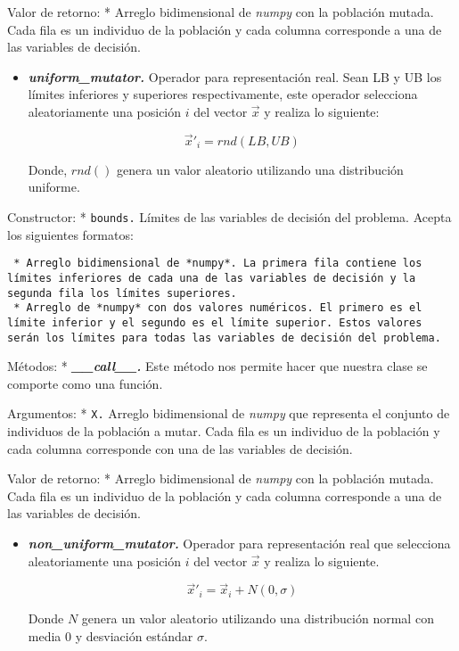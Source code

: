 \documentclass[11pt]{article}
\providecommand{\tightlist}{%
      \setlength{\itemsep}{0pt}\setlength{\parskip}{0pt}}
\begin{document}
Valor de retorno: * Arreglo bidimensional de \emph{numpy} con la
población mutada. Cada fila es un individuo de la población y cada
columna corresponde a una de las variables de decisión.

    \begin{itemize}
\tightlist
\item
  \emph{\textbf{uniform\_mutator.}} Operador para representación real.
  Sean LB y UB los límites inferiores y superiores respectivamente, este
  operador selecciona aleatoriamente una posición \(i\) del vector
  \(\vec{x}\) y realiza lo siguiente:

  \begin{equation}
  \vec{x}'_{i}= rnd(LB,UB)
  \end{equation}

  Donde, \(rnd()\) genera un valor aleatorio utilizando una distribución
  uniforme.
\end{itemize}

Constructor: * \texttt{bounds.} Límites de las variables de decisión del
problema. Acepta los siguientes formatos:

\begin{verbatim}
 * Arreglo bidimensional de *numpy*. La primera fila contiene los límites inferiores de cada una de las variables de decisión y la segunda fila los límites superiores.
 * Arreglo de *numpy* con dos valores numéricos. El primero es el límite inferior y el segundo es el límite superior. Estos valores serán los límites para todas las variables de decisión del problema.
\end{verbatim}

Métodos: * \emph{\textbf{\_\_call\_\_.}} Este método nos permite hacer
que nuestra clase se comporte como una función.

Argumentos: * \texttt{X.} Arreglo bidimensional de \emph{numpy} que
representa el conjunto de individuos de la población a mutar. Cada fila
es un individuo de la población y cada columna corresponde con una de
las variables de decisión.

Valor de retorno: * Arreglo bidimensional de \emph{numpy} con la
población mutada. Cada fila es un individuo de la población y cada
columna corresponde a una de las variables de decisión.

    \begin{itemize}
\tightlist
\item
  \emph{\textbf{non\_uniform\_mutator.}} Operador para representación
  real que selecciona aleatoriamente una posición \(i\) del vector
  \(\vec{x}\) y realiza lo siguiente.

  \begin{equation}
  \vec{x}'_{i} = \vec{x}_{i} + N(0, \sigma)
  \end{equation}

  Donde \(N\) genera un valor aleatorio utilizando una distribución
  normal con media \(0\) y desviación estándar \(\sigma\).
\end{itemize}
\end{document}
